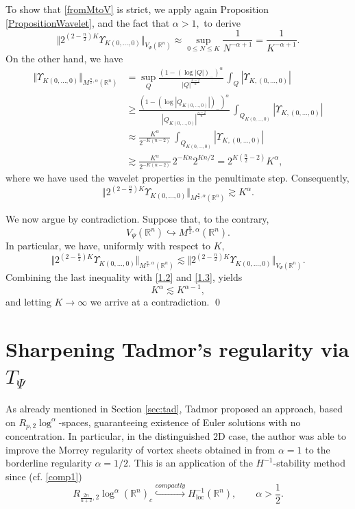 \documentclass[11pt, a4paper,leqno]{amsart}
\theoremstyle{plain}
\numberwithin{equation}{section}
\theoremstyle{definition}
\theoremstyle{remark}
\def\R{\mathbb{R}}
\begin{document}
 To show that \eqref{fromMtoV} is strict, we apply again Proposition \ref{PropositionWavelet},
and the fact that $\alpha>1,$ to derive 
\begin{equation}
\Vert2^{(2-\frac{n}{2})K}\Upsilon_{K (0,\ldots,0)}\Vert_{V_{\Psi
}(\mathbb{R}^{n})}\approx\sup_{0\leq N\leq K}\frac{1}{N^{-\alpha+1}}=\frac
{1}{K^{-\alpha+1}}. \label{1.2}%
\end{equation}
On the other hand, we have
\begin{align*}
\Vert \Upsilon_{K (0,\ldots,0)}\Vert_{M^{\frac{n}{2},\alpha}(\mathbb{R}%
^{n})}  &  =\sup_{Q }\frac{(1-(\log|Q|)_-)^{\alpha}}{|Q|^{\frac{n-2}{n}%
}}\,\int_{Q}|\Upsilon_{K,(0,\ldots,0)}|\\
&  \geq \frac{(1-(\log|Q_{K(0,\ldots,0)} |)_-)^{\alpha}}{|Q_{K(0,\ldots,0)}%
|^{\frac{n-2}{n}}}\,\int_{Q_{K(0,\ldots,0)}}|\Upsilon_{K,(0,\ldots,0)}|\\
&  \approx\frac{K^{\alpha}}{2^{-K(n-2)}}\,\int_{Q_{K(0,\ldots,0)}}%
|\Upsilon_{K,(0,\ldots,0)}|\\
&  \gtrsim\frac{K^{\alpha}}{2^{-K(n-2)}}\,2^{-Kn}2^{Kn/2}=2^{K(\frac{n}{2}%
-2)}K^{\alpha},
\end{align*}
where we have used the wavelet properties in the penultimate step. 
Consequently,
\begin{equation}
\Vert2^{(2-\frac{n}{2})K}\Upsilon_{K (0,\ldots,0)}\Vert_{M^{\frac{n}%
{2},\alpha}(\mathbb{R}^{n})}\gtrsim K^{\alpha}. \label{1.3}%
\end{equation}

We now argue by contradiction. Suppose that, to the contrary,
\begin{equation*}
V_{\Psi}(\mathbb{R}^{n})\hookrightarrow M^{\frac{n}{2},\alpha}(\mathbb{R}%
^{n}).
\end{equation*}
In particular, we have, uniformly with respect to $K,$
\[
\Vert2^{(2-\frac{n}{2})K}\Upsilon_{K (0,\ldots,0)}\Vert_{M^{\frac{n}%
{2},\alpha}(\mathbb{R}^{n})}\lesssim\Vert2^{(2-\frac{n}{2})K}\Upsilon
_{K (0,\ldots,0)}\Vert_{V_{\Psi}(\mathbb{R}^{n})}.
\]
Combining the last inequality with \eqref{1.2} and \eqref{1.3}, yields
\[
K^{\alpha}\lesssim K^{\alpha-1},
\]
and letting $K\rightarrow\infty$ we arrive at a contradiction. \qed

\section{Sharpening Tadmor's regularity via $T_\Psi$\label{Section4}}

As already mentioned in Section \ref{sec:tad}, Tadmor \cite{Tadmor} proposed an approach, based on $R_{p, 2} \log^\alpha$-spaces, guaranteeing existence of Euler solutions with no concentration. In particular, in the distinguished  $2$D case, the author was able to improve the Morrey regularity of vortex sheets obtained in \cite{DiPernaMajda} from $\alpha = 1$ to the borderline regularity $\alpha = 1/2$. This is an application of the $H^{-1}$-stability method since (cf. \eqref{comp1})
\begin{equation}
R_{\frac{2 n}{n+2},2}\log^{\alpha} (\R^n)_c\overset{compactly}{\hookrightarrow}H_{\text{loc}}%
^{-1}(\R^n), \qquad \alpha > \frac{1}{2}.\label{comp1.8}%
\end{equation}
\end{document}
